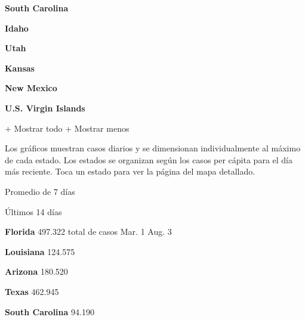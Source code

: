 \href{https://www.nytimes3xbfgragh.onion/interactive/2020/us/south-carolina-coronavirus-cases.html}{}

\textbf{South Carolina}

\href{https://www.nytimes3xbfgragh.onion/interactive/2020/us/idaho-coronavirus-cases.html}{}

\textbf{Idaho}

\href{https://www.nytimes3xbfgragh.onion/interactive/2020/us/utah-coronavirus-cases.html}{}

\textbf{Utah}

\href{https://www.nytimes3xbfgragh.onion/interactive/2020/us/kansas-coronavirus-cases.html}{}

\textbf{Kansas}

\href{https://www.nytimes3xbfgragh.onion/interactive/2020/us/new-mexico-coronavirus-cases.html}{}

\textbf{New Mexico}

\textbf{U.S. Virgin Islands}

+ Mostrar todo + Mostrar menos

Los gráficos muestran casos diarios y se dimensionan individualmente al
máximo de cada estado. Los estados se organizan según los casos per
cápita para el día más reciente. Toca un estado para ver la página del
mapa detallado.

\href{https://www.nytimes3xbfgragh.onion/interactive/2020/us/florida-coronavirus-cases.html}{}

Promedio de 7 días

Últimos 14 días

\textbf{Florida} 497.322 total de casos Mar. 1 Aug. 3

\href{https://www.nytimes3xbfgragh.onion/interactive/2020/us/louisiana-coronavirus-cases.html}{}

\textbf{Louisiana} 124.575

\href{https://www.nytimes3xbfgragh.onion/interactive/2020/us/arizona-coronavirus-cases.html}{}

\textbf{Arizona} 180.520

\href{https://www.nytimes3xbfgragh.onion/interactive/2020/us/texas-coronavirus-cases.html}{}

\textbf{Texas} 462.945

\href{https://www.nytimes3xbfgragh.onion/interactive/2020/us/south-carolina-coronavirus-cases.html}{}

\textbf{South Carolina} 94.190

\href{https://www.nytimes3xbfgragh.onion/interactive/2020/us/idaho-coronavirus-cases.html}{}

